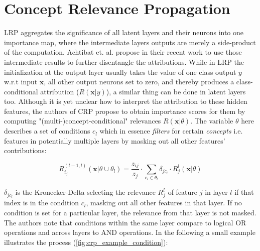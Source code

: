 \section{Concept Relevance Propagation}\label{section:crp_background}

LRP aggregates the significance of all latent layers and their neurons into one importance map, where the intermediate layers outputs are merely a side-product of the computation.
Achtibat et. al. propose in their recent work \cite{Achtibat2022} to use those intermediate results to further disentangle the attributions. While in LRP the initialization at the output layer usually takes the value of one class output $y$ w.r.t input $\mathbf{x}$, all other output neurons set to zero, and thereby produces a class-conditional attribution ($R(\mathbf{x}|y)$), a similar thing can be done in latent layers too. Although it is yet unclear how to interpret the attribution to these hidden features, the authors of CRP propose to obtain importance scores for them by computing "(multi-)concept-conditional" relevances $R(\mathbf{x}|\theta)$. The variable $\theta$ here describes a set of conditions $c_l$ which in essence \textit{filters} for certain \textit{concepts} i.e. features in potentially multiple layers by masking out all other features' contributions:

\begin{equation}
    R^{(l-1, l)}_{i_j} (\mathbf{x} | \theta \cup \theta_l) = \frac{z_{ij}}{z_j} \cdot \sum_{c_l \in \theta_l} \delta_{jc_l} \cdot R^{l}_j (\mathbf{x} | \theta )
\end{equation}

$\delta_{jc_l}$ is the Kronecker-Delta selecting the relevance $R^l_j$ of feature $j$ in layer $l$ if that index is in the condition $c_l$, masking out all other features in that layer. If no condition is set for a particular layer, the relevance from that layer is not masked. The authors note that conditions within the same layer compare to logical OR operations and across layers to AND operations. In the following a small example illustrates the process (\autoref{fig:crp_example_condition}):


